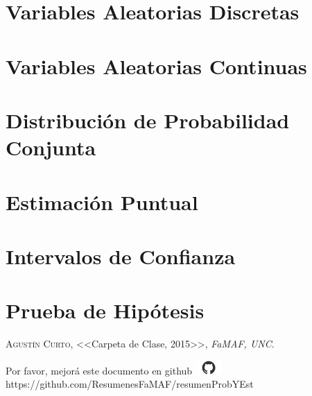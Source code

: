 \documentclass[12pt,a4paper]{report}
\begin{document}
	
\chapter{Variables Aleatorias Discretas}
\chapter{Variables Aleatorias Continuas}
\chapter{Distribución de Probabilidad Conjunta}
\chapter{Estimación Puntual}
\chapter{Intervalos de Confianza}
\chapter{Prueba de Hipótesis}



\begin{thebibliography}{X}
 \textsc{Agustín Curto},
<<Carpeta de Clase, 2015>>,
\textit{FaMAF, UNC}.
\end{thebibliography}

\vspace{\fill}
\begin{center}
Por favor, mejorá este documento en github
\includegraphics[width=1cm]{graphics/github.png} \\
https://github.com/ResumenesFaMAF/resumenProbYEst
\end{center}
\end{document}
